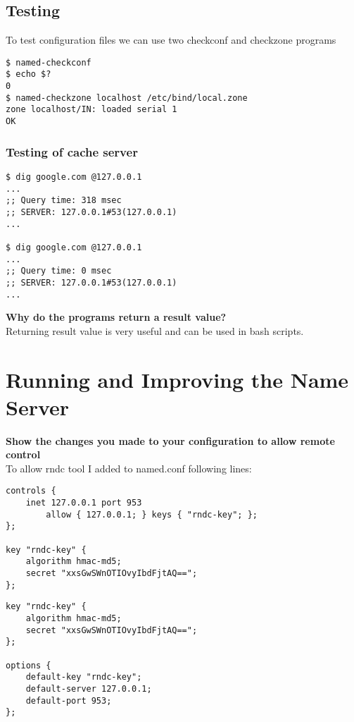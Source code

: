\documentclass[a4paper,11pt]{article}
\theoremstyle{mytheor}
\begin{document}
\subsection{Testing}
To test configuration files we can use two checkconf and checkzone programs

\begin{lstlisting}
$ named-checkconf
$ echo $?
0
$ named-checkzone localhost /etc/bind/local.zone
zone localhost/IN: loaded serial 1
OK
\end{lstlisting}

\subsubsection{Testing of cache server}
\begin{lstlisting}
$ dig google.com @127.0.0.1
...
;; Query time: 318 msec
;; SERVER: 127.0.0.1#53(127.0.0.1)
...

$ dig google.com @127.0.0.1
...
;; Query time: 0 msec
;; SERVER: 127.0.0.1#53(127.0.0.1)
...
\end{lstlisting}

\textbf{Why do the programs return a result value?}\\
Returning result value is very useful and can be used in bash scripts.

\section{Running and Improving the Name Server}

\textbf{Show the changes you made to your configuration to allow remote control}\\
To allow rndc tool I added to named.conf following lines:

\begin{lstlisting}[caption=named.conf]
controls {
    inet 127.0.0.1 port 953
        allow { 127.0.0.1; } keys { "rndc-key"; };
};

key "rndc-key" {
    algorithm hmac-md5;
    secret "xxsGwSWnOTIOvyIbdFjtAQ==";
};
\end{lstlisting}

\begin{lstlisting}[caption=rndc.conf]
key "rndc-key" {
    algorithm hmac-md5;
    secret "xxsGwSWnOTIOvyIbdFjtAQ==";
};

options {
    default-key "rndc-key";
    default-server 127.0.0.1;
    default-port 953;
};

\end{lstlisting}
\end{document}

